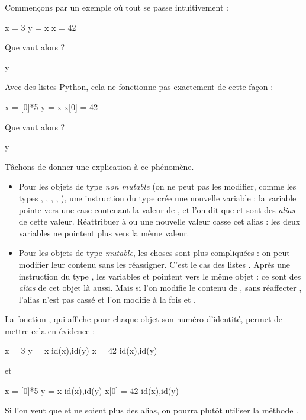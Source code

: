 Commençons par un exemple où tout se passe intuitivement :
\begin{pyconsole}
x = 3
y = x
x = 42
\end{pyconsole}
Que vaut alors  ? 
\begin{pyconsole}
y
\end{pyconsole}

Avec des listes Python, cela ne fonctionne pas exactement de cette façon : 
\begin{pyconsole}
x = [0]*5
y = x
x[0] = 42
\end{pyconsole}
Que vaut alors  ? 
\begin{pyconsole}
y
\end{pyconsole}
Tâchons de donner une explication à ce phénomène.
\begin{itemize}
  \item Pour les objets de type \emph{non mutable} (on ne peut pas les modifier, comme les types 
  , , , , ), une instruction du type  
crée une nouvelle variable : la variable  pointe vers une case contenant la valeur de 
, et l'on dit que  et  sont des \emph{alias} de cette valeur. Réattribuer à 
 ou  une nouvelle valeur casse cet alias : les deux variables ne pointent plus vers la 
même valeur.
  \item Pour les objets de type \emph{mutable}, les choses sont plus compliquées : on peut modifier 
leur contenu sans les réassigner. C'est le cas des listes \python. Après une instruction du type 
 , les variables  et  pointent vers le même objet : ce sont des 
\emph{alias} de cet objet là aussi. Mais si l'on modifie le contenu de , sans réaffecter 
, l'alias n'est pas cassé et l'on modifie à la fois  et .
\end{itemize}

La fonction , qui affiche pour chaque objet son \og numéro d'identité\fg, permet de 
mettre cela en évidence :

\begin{pyconsole}
x = 3
y = x
id(x),id(y)
x = 42
id(x),id(y)
\end{pyconsole}

et

\begin{pyconsole}
x = [0]*5
y = x
id(x),id(y)
x[0] = 42
id(x),id(y)
\end{pyconsole}

Si l'on veut que  et  ne soient plus des alias, on pourra plutôt utiliser la méthode 
.

